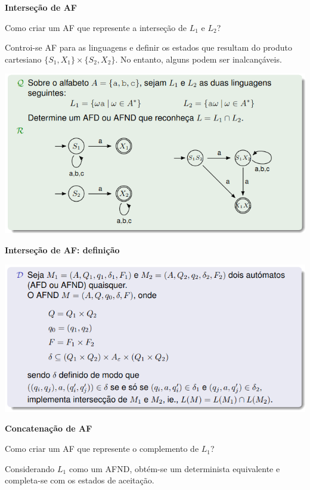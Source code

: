 \documentclass{article}
\begin{document}
\begin{flushleft}
  \textbf{Interseção de AF}

  \begin{center}
    Como criar um AF que represente a interseção de $L_1$ e $L_2$?

    Controi-se AF para as linguagens e definir os estados que resultam do produto
    cartesiano $\{S_1, X_1\} \times \{S_2, X_2\}$. No entanto, alguns podem ser inalcançáveis.

    \begin{center}
      \includegraphics[scale=0.4]{72}
    \end{center}
  \end{center}

  \textbf{Interseção de AF: definição}

  \begin{center}
    \includegraphics[scale=0.4]{73}
  \end{center}

  \pagebreak

  \textbf{Concatenação de AF}

  \begin{center}
    Como criar um AF que represente o complemento de $L_1$?

    Considerando $L_1$ como um AFND, obtém-se um determinista equivalente e completa-se
    com os estados de aceitação.


\end{center}
\end{flushleft}
\end{document}
